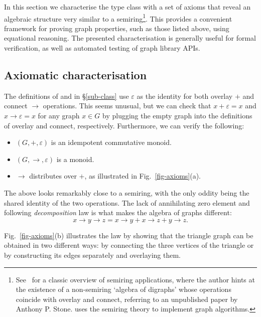 In this section we characterise the  type class with a set of
axioms that reveal an algebraic structure very similar to a semiring\footnote{
See~\citet{1999_semirings_golan} for a classic overview of semiring
applications, where the author hints at the existence of a non-semiring `algebra of
digraphs' whose operations coincide with overlay and connect, referring to an unpublished
paper by Anthony P. Stone. \citet{2013_semirings_dolan} uses the semiring theory to
implement graph algorithms.}.
This provides a convenient framework for proving graph properties, such as
those listed above, using equational reasoning. The presented characterisation is
generally useful for formal verification, as well as automated testing of graph library
APIs.

\subsection{Axiomatic characterisation}\label{sub-laws}

The definitions of  and  in \S\ref{sub-class}
use $\varepsilon$ as the identity for both overlay $+$ and connect $\rightarrow$
operations. This seems unusual, but we can check that
$x + \varepsilon = x$ and $x \rightarrow \varepsilon = x$ for any graph $x \in G$
by plugging the empty graph into the definitions of overlay and connect,
respectively. Furthermore, we can verify the following:
\begin{itemize}
    \item $(G,+,\varepsilon)$ is an idempotent commutative monoid.
    \item $(G,\rightarrow,\varepsilon)$ is a monoid.
    \item $\rightarrow$ distributes over $+$, as illustrated
    in Fig.~\ref{fig-axioms}(a).
\end{itemize}

\noindent
The above looks remarkably close to a semiring, with the only oddity being the shared
identity of the two operations. The lack of annihilating zero element and
following \emph{decomposition} law is what makes the algebra of graphs different:
\[
x \rightarrow y \rightarrow z = x \rightarrow y + x \rightarrow z + y \rightarrow z.
\]

\noindent
Fig.~\ref{fig-axioms}(b) illustrates the law by showing that the triangle
graph can be obtained in two different ways: by connecting the three vertices
of the triangle or by constructing its edges separately and overlaying them.

